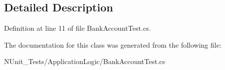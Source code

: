 \subsection{Detailed Description}


Definition at line 11 of file BankAccountTest.cs.



The documentation for this class was generated from the following file:\begin{DoxyCompactItemize}
\item 
NUnit\_\-Tests/ApplicationLogic/BankAccountTest.cs\end{DoxyCompactItemize}

